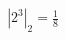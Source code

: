 \documentclass[preview]{standalone}
\begin{document}
\begin{align*}
\left| 2^{3} \right|_2 = \frac{1}{8}
\end{align*}
\end{document}
